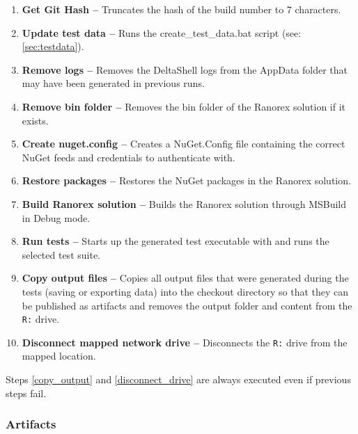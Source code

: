 \documentclass{article}
\newcommand{\inlverb}[1]{\colorbox{cverbbg}{\texttt{#1}}}
\begin{document}
\begin{enumerate}

    \item \textbf{Get Git Hash --} 
    Truncates the hash of the build number to 7 characters.
    
    \item \textbf{Update test data --}
    Runs the create\_test\_data.bat script (see: \ref{sec:testdata}).
    
    \item \textbf{Remove logs --}
    Removes the DeltaShell logs from the AppData folder that may have been generated in previous runs. 
    
    \item \textbf{Remove bin folder --}
    Removes the bin folder of the Ranorex solution if it exists.
    
    \item \textbf{Create nuget.config --}
    Creates a NuGet.Config file containing the correct NuGet feeds and credentials to authenticate with.
    
    \item \textbf{Restore packages --}
    Restores the NuGet packages in the Ranorex solution.
    
    \item \textbf{Build Ranorex solution --}
    Builds the Ranorex solution through MSBuild in Debug mode.
    
    \item \textbf{Run tests --}
    Starts up the generated test executable with and runs the selected test suite. 
    
    \item \label{copy_output} \textbf{Copy output files --}
    Copies all output files that were generated during the tests (saving or exporting data) into the checkout directory so that they can be published as artifacts and removes the output folder and content from the \inlverb{R:} drive.
    
    \item \label{disconnect_drive} \textbf{Disconnect mapped network drive --}
    Disconnects the \inlverb{R:} drive from the mapped location.
    
\end{enumerate}

Steps \ref{copy_output} and \ref{disconnect_drive} are always executed even if previous steps fail. 

\subsubsection{Artifacts}
\end{document}
